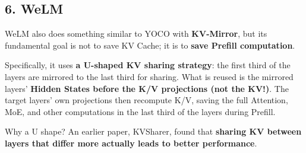 \documentclass[
  11pt,
  a4paper,
]{article}
\begin{document}
\subsection{6. WeLM}\label{welm}

WeLM also does something similar to YOCO with \textbf{KV-Mirror}, but
its fundamental goal is not to save KV Cache; it is to \textbf{save
Prefill computation}.

Specifically, it uses \textbf{a U-shaped KV sharing strategy}: the first
third of the layers are mirrored to the last third for sharing. What is
reused is the mirrored layers' \textbf{Hidden States before the K/V
projections (not the KV!)}. The target layers' own projections then
recompute K/V, saving the full Attention, MoE, and other computations in
the last third of the layers during Prefill.

Why a U shape? An earlier paper, KVSharer, found that \textbf{sharing KV
between layers that differ more actually leads to better performance}.
\end{document}
